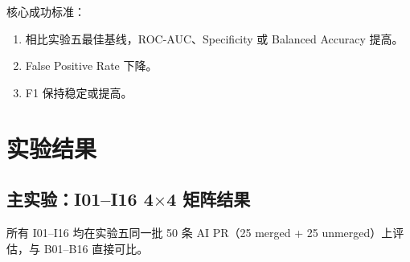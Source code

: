 \documentclass{experimentreport}
\begin{document}
核心成功标准：
\begin{enumerate}
    \item 相比实验五最佳基线，ROC-AUC、Specificity 或 Balanced Accuracy 提高。
    \item False Positive Rate 下降。
    \item F1 保持稳定或提高。
\end{enumerate}

\section{实验结果}

\subsection{主实验：I01--I16 4$\times$4 矩阵结果}

所有 I01--I16 均在实验五同一批 50 条 AI PR（25 merged + 25 unmerged）上评估，与 B01--B16 直接可比。
\end{document}

